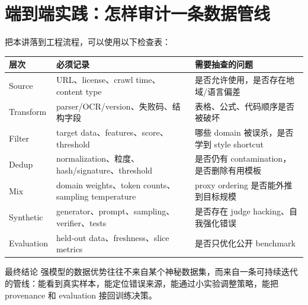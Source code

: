 \section{端到端实践：怎样审计一条数据管线}

把本讲落到工程流程，可以使用以下检查表：

\begin{longtable}{L{0.17\textwidth}L{0.35\textwidth}L{0.38\textwidth}}
\toprule
层次 & 必须记录 & 需要抽查的问题 \\
\midrule
Source & URL、license、crawl time、content type & 是否允许使用，是否存在地域/语言偏差 \\
Transform & parser/OCR/version、失败码、结构字段 & 表格、公式、代码顺序是否被破坏 \\
Filter & target data、features、score、threshold & 哪些 domain 被误杀，是否学到 style shortcut \\
Dedup & normalization、粒度、hash/signature、threshold & 是否仍有 contamination，是否删除有用模板 \\
Mix & domain weights、token counts、sampling temperature & proxy ordering 是否能外推到目标规模 \\
Synthetic & generator、prompt、sampling、verifier、tests & 是否存在 judge hacking、自我强化错误 \\
Evaluation & held-out data、freshness、slice metrics & 是否只优化公开 benchmark \\
\bottomrule
\end{longtable}

\begin{importantbox}{最终结论}
强模型的数据优势往往不来自某个神秘数据集，而来自一条可持续迭代的管线：能看到真实样本，能定位错误来源，能通过小实验调整策略，能把 provenance 和 evaluation 接回训练决策。
\end{importantbox}

